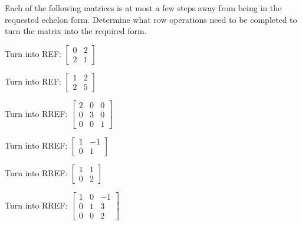 \begin{activity} Each of the following matrices is at most a few steps away from being in the requested echelon form. Determine what row operations need to be completed to turn the matrix into the required form.

\ba
\begin{minipage}{2.4in}
\item Turn into REF: $\left[ \begin{array}{cc} 0 & 2 \\ 2 & 1 \end{array} \right]$
\end{minipage} 
\begin{minipage}{2.0in}
\item Turn into REF: $\left[ \begin{array}{cc} 1 & 2 \\ 2 & 5 \end{array} \right]$
\end{minipage}

\begin{minipage}{2.4in}
\item Turn into RREF: $\left[ \begin{array}{ccc} 2 & 0 &0 \\ 0 & 3 &0 \\ 0&0&1\end{array} \right]$
\end{minipage}
\begin{minipage}{2.0in}
\item Turn into RREF: $\left[ \begin{array}{cr} 1& -1 \\ 0 & 1 \end{array} \right]$
\end{minipage}

\begin{minipage}{2.4in}
\item Turn into RREF: $\left[ \begin{array}{cc} 1& 1 \\ 0 & 2 \end{array} \right]$
\end{minipage}
\begin{minipage}{2.0in}
\item Turn into RREF: $\left[ \begin{array}{ccr} 1& 0 &-1 \\ 0 & 1 &3 \\ 0&0&2 \end{array} \right]$
\end{minipage}
\ea

\end{activity}

